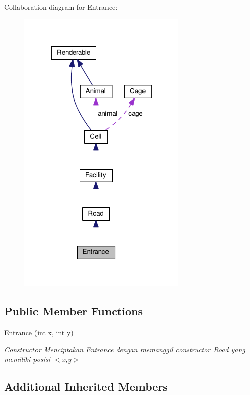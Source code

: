 Collaboration diagram for Entrance\+:
\nopagebreak
\begin{figure}[H]
\begin{center}
\leavevmode
\includegraphics[width=228pt]{classEntrance__coll__graph}
\end{center}
\end{figure}
\subsection*{Public Member Functions}
\begin{DoxyCompactItemize}
\item 
\hyperlink{classEntrance_acfb8b9f5d174b102562ee8989b8e20d4}{Entrance} (int x, int y)
\begin{DoxyCompactList}\small\item\em Constructor Menciptakan \hyperlink{classEntrance}{Entrance} dengan memanggil constructor \hyperlink{classRoad}{Road} yang memiliki posisi $<$x,y$>$ \end{DoxyCompactList}\end{DoxyCompactItemize}
\subsection*{Additional Inherited Members}


